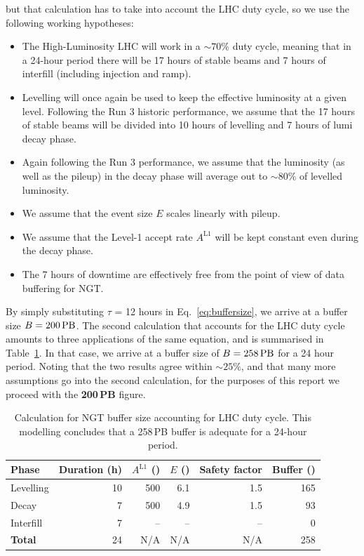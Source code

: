 \begin{itemize}
but that calculation has to take into account the LHC duty cycle, so we use the following working hypotheses:
\begin{itemize}
\item The High-Luminosity LHC will work in a $\sim70\%$ duty cycle, meaning that in a 24-hour period there will be 17 hours of stable beams and 7 hours of interfill (including injection and ramp).
\item Levelling will once again be used to keep the effective luminosity at a given level.
Following the Run 3 historic performance, we assume that the 17 hours of stable beams will be divided into 10 hours of levelling and 7 hours of lumi decay phase.
\item Again following the Run 3 performance, we assume that the luminosity (as well as the pileup) in the decay phase will average out to $\sim80\%$ of levelled luminosity.
\item We assume that the event size $E$ scales linearly with pileup.
\item We assume that the Level-1 accept rate $A^{\text{L1}}$ will be kept constant even during the decay phase. 
\item The 7 hours of downtime are effectively free from the point of view of data buffering for NGT.
\end{itemize}
\end{itemize}

By simply substituting $\tau$ = 12 hours in Eq.~\ref{eq:buffersize}, we arrive at a buffer size $B = 200\,\text{PB}$.
The second calculation that accounts for the LHC duty cycle amounts to three applications of the same equation,
and is summarised in Table~\ref{tab:bufferWithDutyCycle}. In that case, we arrive at a buffer size of $B = 258\,\text{PB}$ for a 24 hour period.
Noting that the two results agree within $\sim25\%$, and that many more assumptions go into the second calculation, for the purposes of this report we proceed with the \textbf{200\,PB} figure.
\begin{table}[htbp]
   \centering
   \begin{tabular}{@{} lrrrrr @{}} %
      \toprule
		Phase & Duration (h) & $A^{\text{L1}}$ (\kHz) & $E$ (\MB) & Safety factor & Buffer (\PB)\\
      	\midrule
		Levelling & 10 & 500 & 6.1 & 1.5 & 165 \\
		Decay     &  7 & 500 & 4.9 & 1.5 &  93 \\
		Interfill &  7 &  -- &  -- &  -- &   0 \\
		\midrule
\textbf{Total}    & 24 & N/A & N/A & N/A & 258\\ 
      \bottomrule
   \end{tabular}
   \caption{Calculation for NGT buffer size accounting for LHC duty cycle. 
   This modelling concludes that a 258\,PB buffer is adequate for a 24-hour period.}
   \label{tab:bufferWithDutyCycle}
\end{table}

